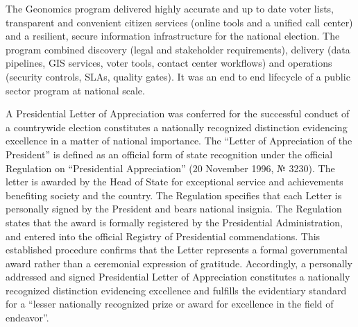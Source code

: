 The Geonomics program delivered highly accurate and up to date voter lists, transparent and convenient citizen services (online tools and a unified call center) and a resilient, secure information infrastructure for the national election. The program combined discovery (legal and stakeholder requirements), delivery (data pipelines, GIS services, voter tools, contact center workflows) and operations (security controls, SLAs, quality gates). It was an end to end lifecycle of a public sector program at national scale.

A Presidential Letter of Appreciation was conferred for the successful conduct of a countrywide election constitutes a nationally recognized distinction evidencing excellence in a matter of national importance. The ``Letter of Appreciation of the President'' is defined as an official form of state recognition under the official Regulation on ``Presidential Appreciation'' (20 November 1996, № 3230). The letter is awarded by the Head of State for exceptional service and achievements benefiting society and the country. The Regulation specifies that each Letter is personally signed by the President and bears national insignia. The Regulation states that the award is formally registered by the Presidential Administration, and entered into the official Registry of Presidential commendations. This established procedure confirms that the Letter represents a formal governmental award rather than a ceremonial expression of gratitude. Accordingly, a personally addressed and signed Presidential Letter of Appreciation constitutes a nationally recognized distinction evidencing excellence and fulfills the evidentiary standard for a ``lesser nationally recognized prize or award for excellence in the field of endeavor''.



